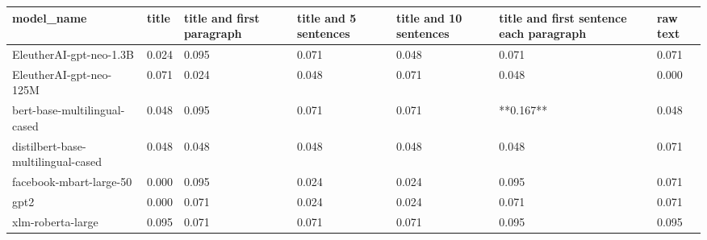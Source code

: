 \begin{tabular}{lllllll}
\toprule
                        model\_name & title & title and first paragraph & title and 5 sentences & title and 10 sentences & title and first sentence each paragraph & raw text \\
\midrule
           EleutherAI-gpt-neo-1.3B & 0.024 &                     0.095 &                 0.071 &                  0.048 &                                   0.071 &    0.071 \\
           EleutherAI-gpt-neo-125M & 0.071 &                     0.024 &                 0.048 &                  0.071 &                                   0.048 &    0.000 \\
      bert-base-multilingual-cased & 0.048 &                     0.095 &                 0.071 &                  0.071 &                               **0.167** &    0.048 \\
distilbert-base-multilingual-cased & 0.048 &                     0.048 &                 0.048 &                  0.048 &                                   0.048 &    0.071 \\
           facebook-mbart-large-50 & 0.000 &                     0.095 &                 0.024 &                  0.024 &                                   0.095 &    0.071 \\
                              gpt2 & 0.000 &                     0.071 &                 0.024 &                  0.024 &                                   0.071 &    0.071 \\
                 xlm-roberta-large & 0.095 &                     0.071 &                 0.071 &                  0.071 &                                   0.095 &    0.095 \\
\bottomrule
\end{tabular}
